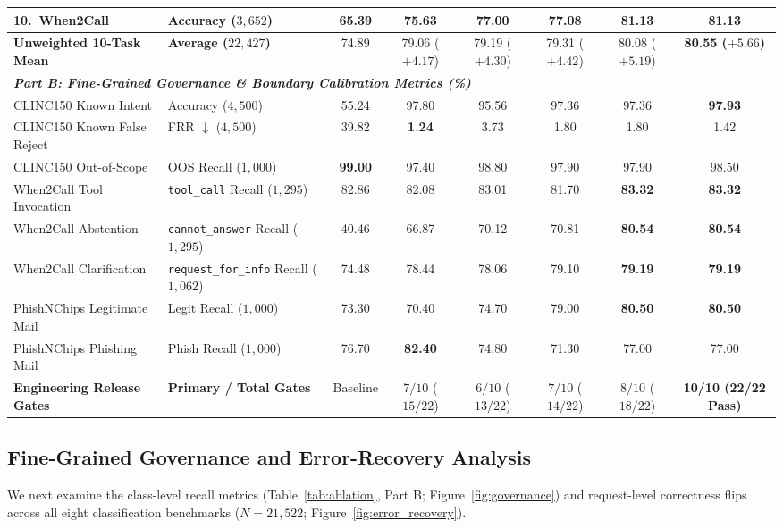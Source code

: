 \documentclass[10pt,twocolumn]{article}
\begin{document}
\begin{table}[t]
{\begin{tabular}{llcccccc}
10.\ When2Call & Accuracy ($3{,}652$) & 65.39 & 75.63 & 77.00 & 77.08 & \textbf{81.13} & \textbf{81.13} \\
\midrule
\textbf{Unweighted 10-Task Mean} & \textbf{Average ($22{,}427$)} & 74.89 & 79.06 ($+4.17$) & 79.19 ($+4.30$) & 79.31 ($+4.42$) & 80.08 ($+5.19$) & \textbf{80.55 ($+5.66$)} \\
\midrule
\multicolumn{8}{l}{\textit{\textbf{Part B: Fine-Grained Governance \& Boundary Calibration Metrics (\%)}}} \\
CLINC150 Known Intent & Accuracy ($4{,}500$) & 55.24 & 97.80 & 95.56 & 97.36 & 97.36 & \textbf{97.93} \\
CLINC150 Known False Reject & FRR $\downarrow$ ($4{,}500$) & 39.82 & \textbf{1.24} & 3.73 & 1.80 & 1.80 & 1.42 \\
CLINC150 Out-of-Scope & OOS Recall ($1{,}000$) & \textbf{99.00} & 97.40 & 98.80 & 97.90 & 97.90 & 98.50 \\
When2Call Tool Invocation & \texttt{tool\_call} Recall ($1{,}295$) & 82.86 & 82.08 & 83.01 & 81.70 & \textbf{83.32} & \textbf{83.32} \\
When2Call Abstention & \texttt{cannot\_answer} Recall ($1{,}295$) & 40.46 & 66.87 & 70.12 & 70.81 & \textbf{80.54} & \textbf{80.54} \\
When2Call Clarification & \texttt{request\_for\_info} Recall ($1{,}062$) & 74.48 & 78.44 & 78.06 & 79.10 & \textbf{79.19} & \textbf{79.19} \\
PhishNChips Legitimate Mail & Legit Recall ($1{,}000$) & 73.30 & 70.40 & 74.70 & 79.00 & \textbf{80.50} & \textbf{80.50} \\
PhishNChips Phishing Mail & Phish Recall ($1{,}000$) & 76.70 & \textbf{82.40} & 74.80 & 71.30 & 77.00 & 77.00 \\
\midrule
\textbf{Engineering Release Gates} & \textbf{Primary / Total Gates} & Baseline & $7/10$ ($15/22$) & $6/10$ ($13/22$) & $7/10$ ($14/22$) & $8/10$ ($18/22$) & \textbf{10/10 (22/22 Pass)} \\
\bottomrule
\end{tabular}%
}
\end{table}

\subsection{Fine-Grained Governance and Error-Recovery Analysis}
We next examine the class-level recall metrics (Table~\ref{tab:ablation}, Part B; Figure~\ref{fig:governance}) and request-level correctness flips across all eight classification benchmarks ($N = 21{,}522$; Figure~\ref{fig:error_recovery}).
\end{document}

